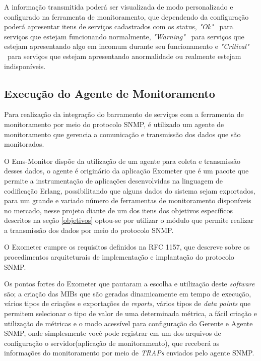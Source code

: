 A informação transmitida poderá ser visualizada de modo personalizado e configurado na ferramenta de monitoramento, que dependendo da configuração poderá apresentar itens de serviços cadastrados com os status, \textit{"Ok"} \ para serviços que estejam funcionando normalmente, \textit{"Warning"} \  para serviços que estejam apresentando algo em incomum durante seu funcionamento e \textit{"Critical"} \ para serviços que estejam apresentando anormalidade ou realmente estejam indisponíveis.	 


\subsection{Execução do Agente de Monitoramento}

Para realização da integração do barramento de serviços com a ferramenta de monitoramento por meio do protocolo \acrshort{SNMP}, é utilizado um agente de monitoramento que gerencia a comunicação e transmissão dos dados que são monitorados. 

O Ems-Monitor dispõe da utilização de um agente para coleta e transmissão desses dados, o agente é originário da aplicação Exometer que é um pacote que permite a instrumentação de aplicações desenvolvidas na linguagem de codificação Erlang, possibilitando que alguns dados do sistema sejam exportados, para um grande e variado número de ferramentas de monitoramento disponíveis no mercado\cite{exometer_core}, nesse projeto diante de um dos itens dos objetivos específicos descritos na seção \ref{objetivos} optou-se por utilizar o módulo que permite realizar a transmissão dos dados por meio do protocolo \acrshort{SNMP}. 

O Exometer cumpre os requisitos definidos na \acrshort{RFC} 1157, que descreve sobre os procedimentos arquiteturais de implementação e implantação do protocolo \acrshort{SNMP}. 

Os pontos fortes do Exometer que pautaram a escolha e utilização deste \textit{software} são; a criação das \acrshort{MIBs} que são geradas dinamicamente em tempo de execução, vários tipos de criações e exportações de \textit{reports}, vários tipos de \textit{data points} que permitem selecionar o tipo de valor de uma determinada métrica, a fácil criação e utilização de métricas e o modo acessível para configuração do Gerente e Agente \acrshort{SNMP}, onde simplesmente você pode registrar em um dos arquivos de configuração o servidor(aplicação de monitoramento), que receberá as informações do monitoramento por meio de \textit{TRAPs} enviados pelo agente \acrshort{SNMP}. 

